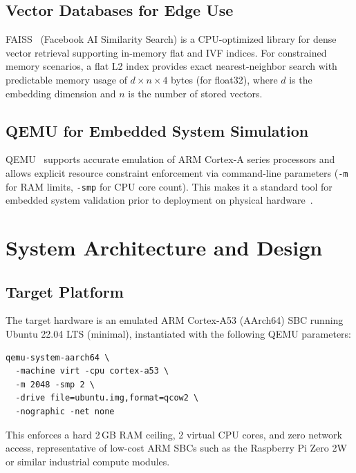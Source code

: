 \documentclass[10pt,twocolumn]{article}
\begin{document}
\subsection{Vector Databases for Edge Use}

FAISS~\cite{faiss2021} (Facebook AI Similarity Search) is a CPU-optimized library for dense vector retrieval supporting in-memory flat and IVF indices. For constrained memory scenarios, a flat L2 index provides exact nearest-neighbor search with predictable memory usage of $d \times n \times 4$ bytes (for float32), where $d$ is the embedding dimension and $n$ is the number of stored vectors.

\subsection{QEMU for Embedded System Simulation}

QEMU~\cite{QEMU} supports accurate emulation of ARM Cortex-A series processors and allows explicit resource constraint enforcement via command-line parameters (\texttt{-m} for RAM limits, \texttt{-smp} for CPU core count). This makes it a standard tool for embedded system validation prior to deployment on physical hardware~\cite{EspressifESP32}.

\section{System Architecture and Design}
\label{sec:architecture}

\subsection{Target Platform}

The target hardware is an emulated ARM Cortex-A53 (AArch64) SBC running Ubuntu 22.04 LTS (minimal), instantiated with the following QEMU parameters:

\begin{verbatim}
qemu-system-aarch64 \
  -machine virt -cpu cortex-a53 \
  -m 2048 -smp 2 \
  -drive file=ubuntu.img,format=qcow2 \
  -nographic -net none
\end{verbatim}

This enforces a hard 2\,GB RAM ceiling, 2 virtual CPU cores, and zero network access, representative of low-cost ARM SBCs such as the Raspberry Pi Zero 2W or similar industrial compute modules.
\end{document}
